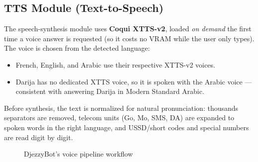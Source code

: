 \documentclass[12pt, a4paper]{report}
\newcommand{\humantext}[1]{#1}      %
\begin{document}
\subsection{TTS Module (Text-to-Speech)}
\humantext{The speech-synthesis module uses \textbf{Coqui XTTS-v2}, loaded \emph{on demand} the first time a voice answer is requested (so it costs no VRAM while the user only types). The voice is chosen from the detected language:}
\begin{itemize}[noitemsep]
    \item \humantext{French, English, and Arabic use their respective XTTS-v2 voices.}
    \item \humantext{Darija has no dedicated XTTS voice, so it is spoken with the Arabic voice --- consistent with answering Darija in Modern Standard Arabic.}
\end{itemize}
\humantext{Before synthesis, the text is normalized for natural pronunciation: thousands separators are removed, telecom units (Go, Mo, SMS, DA) are expanded to spoken words in the right language, and USSD/short codes and special numbers are read digit by digit.}

\begin{figure}[H]
\centering
{}
\caption{DjezzyBot's voice pipeline workflow}
\label{fig:voice_pipeline}
\end{figure}
\end{document}
